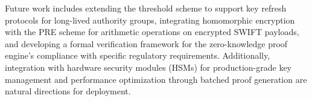 \documentclass[conference,10pt]{IEEEtran}
\begin{document}
Future work includes extending the threshold scheme to support key refresh protocols for long-lived authority groups, integrating homomorphic encryption with the PRE scheme for arithmetic operations on encrypted SWIFT payloads, and developing a formal verification framework for the zero-knowledge proof engine's compliance with specific regulatory requirements. Additionally, integration with hardware security modules (HSMs) for production-grade key management and performance optimization through batched proof generation are natural directions for deployment.



\end{document}
